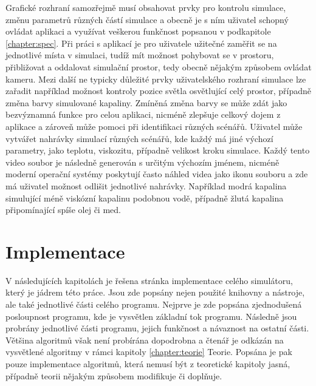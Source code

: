 Grafické rozhraní samozřejmě musí obsahovat prvky pro kontrolu simulace, změnu parametrů různých částí simulace a obecně je s ním uživatel schopný ovládat aplikaci a využívat veškerou funkčnost popsanou v podkapitole \ref{chapter:spec}. Při práci s aplikací je pro uživatele užitečné zaměřit se na jednotlivé místa v simulaci, tudíž mít možnost pohybovat se v prostoru, přibližovat a oddalovat simulační prostor, tedy obecně nějakým způsobem ovládat kameru. Mezi další ne typicky důležité prvky uživatelského rozhraní simulace lze zařadit například možnost kontroly pozice světla osvětlující celý prostor, případně změna barvy simulované kapaliny. Zmíněná změna barvy se může zdát jako bezvýznamná funkce pro celou aplikaci, nicméně zlepšuje celkový dojem z aplikace a zároveň může pomoci při identifikaci různých scénářů. Uživatel může vytvářet nahrávky simulací různých scénářů, kde každý má jiné výchozí parametry, jako teplotu, viskozitu, případně velikost kroku simulace. Každý tento video soubor je následně generován s určitým výchozím jménem, nicméně moderní operační systémy poskytují často náhled videa jako ikonu souboru a zde má uživatel možnost odlišit jednotlivé nahrávky. Například modrá kapalina simulující méně viskózní kapalinu podobnou vodě, případně žlutá kapalina připomínající spíše olej či med.

\chapter{Implementace}
\label{chapter:implementace}
V následujících kapitolách je řešena stránka implementace celého simulátoru, který je jádrem této práce. Jsou zde popsány nejen použité knihovny a nástroje, ale také jednotlivé části celého programu. Nejprve je zde popsána zjednodušená posloupnost programu, kde je vysvětlen základní tok programu. Následně jsou probrány jednotlivé části programu, jejich funkčnost a návaznost na ostatní části. Většina algoritmů však není probírána dopodrobna a čtenář je odkázán na vysvětlené algoritmy v rámci kapitoly \ref{chapter:teorie} Teorie. Popsána je pak pouze implementace algoritmů, která nemusí být z teoretické kapitoly jasná, případně teorii nějakým způsobem modifikuje či doplňuje.

